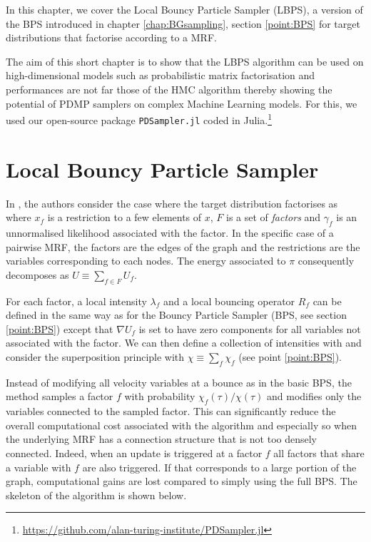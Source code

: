 
In this chapter, we cover the Local Bouncy Particle Sampler (LBPS), a version of the BPS introduced in chapter \ref{chap:BGsampling}, section \ref{point:BPS} for target distributions that factorise according to a MRF.

The aim of this short chapter is to show that the LBPS algorithm can be used on high-dimensional models such as probabilistic matrix factorisation and performances are not far those of the HMC algorithm thereby showing the potential of PDMP samplers on complex Machine Learning models. For this, we used our open-source package \texttt{PDSampler.jl} coded in Julia.\footnote{\url{https://github.com/alan-turing-institute/PDSampler.jl}} 

\section{Local Bouncy Particle Sampler}
In \cite{bouchard15}, the authors consider the case where the target distribution factorises as
%
%
where $x_{f}$ is a restriction to a few elements of $x$, $F$ is a set of \emph{factors} and $\gamma_{f}$ is an unnormalised likelihood associated with the factor. In the specific case of a pairwise MRF, the factors are the edges of the graph and the restrictions are the variables corresponding to each nodes. The energy associated to $\pi$ consequently decomposes as $U\equiv \sum_{f\in F}U_{f}$.

For each factor, a local intensity $\lambda_{f}$ and a local bouncing operator $R_{f}$ can be defined in the same way as for the Bouncy Particle Sampler (BPS, see section \ref{point:BPS}) except that $\nabla U_{f}$ is set to have zero components for all variables not associated with the factor. We can then define a collection of intensities with
%
%
and consider the superposition principle with $\chi\equiv\sum_{f} \chi_{f}$ (see point \ref{point:BPS}).

Instead of modifying all velocity variables at a bounce as in the basic BPS, the method samples a factor $f$ with probability $\chi_{f}(\tau)/\chi(\tau)$ and modifies only the variables connected to the sampled factor. 
This can significantly reduce the overall computational cost associated with the algorithm and especially so when the underlying MRF has a connection structure that is not too densely connected. Indeed, when an update is triggered at a factor $f$ all factors that share a variable with $f$ are also triggered. If that corresponds to a large portion of the graph, computational gains are lost compared to simply using the full BPS. The skeleton of the algorithm is shown below.



